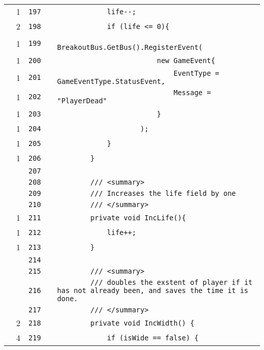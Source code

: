 \documentclass[a4paper,landscape,10pt]{article}
\begin{document}
\begin{longtable}[l]{lrrll}
\cellcolor{green} & 1 & \verb~197~ & & \verb~            life--;~\\
\cellcolor{green} & 2 & \verb~198~ & & \verb~            if (life <= 0){~\\
\cellcolor{green} & 1 & \verb~199~ & & \verb~                BreakoutBus.GetBus().RegisterEvent(~\\
\cellcolor{green} & 1 & \verb~200~ & & \verb~                        new GameEvent{~\\
\cellcolor{green} & 1 & \verb~201~ & & \verb~                            EventType = GameEventType.StatusEvent,~\\
\cellcolor{green} & 1 & \verb~202~ & & \verb~                            Message = "PlayerDead"~\\
\cellcolor{green} & 1 & \verb~203~ & & \verb~                        }~\\
\cellcolor{green} & 1 & \verb~204~ & & \verb~                    );~\\
\cellcolor{green} & 1 & \verb~205~ & & \verb~            }~\\
\cellcolor{green} & 1 & \verb~206~ & & \verb~        }~\\
\cellcolor{gray} &  & \verb~207~ & & \verb~~\\
\cellcolor{gray} &  & \verb~208~ & & \verb~        /// <summary>~\\
\cellcolor{gray} &  & \verb~209~ & & \verb~        /// Increases the life field by one~\\
\cellcolor{gray} &  & \verb~210~ & & \verb~        /// </summary>~\\
\cellcolor{green} & 1 & \verb~211~ & & \verb~        private void IncLife(){~\\
\cellcolor{green} & 1 & \verb~212~ & & \verb~            life++;~\\
\cellcolor{green} & 1 & \verb~213~ & & \verb~        }~\\
\cellcolor{gray} &  & \verb~214~ & & \verb~~\\
\cellcolor{gray} &  & \verb~215~ & & \verb~        /// <summary>~\\
\cellcolor{gray} &  & \verb~216~ & & \verb~        /// doubles the exstent of player if it has not already been, and saves the time it is done.~\\
\cellcolor{gray} &  & \verb~217~ & & \verb~        /// </summary>~\\
\cellcolor{green} & 2 & \verb~218~ & & \verb~        private void IncWidth() {~\\
\cellcolor{green} & 4 & \verb~219~ & & \verb~            if (isWide == false) {~\\

\end{longtable}
\end{document}
